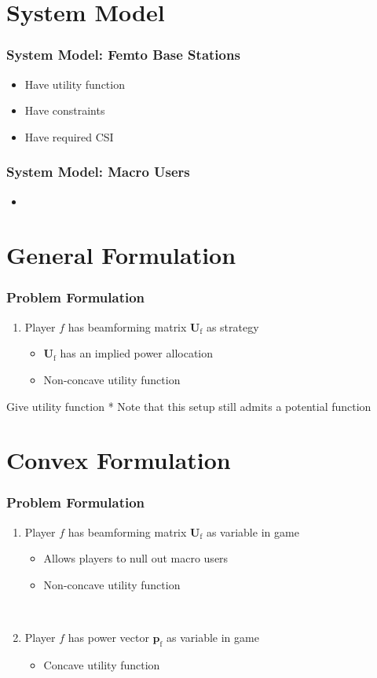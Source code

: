 \documentclass[10pt,tgadventor, onlymath]{beamer}
\begin{document}
\section{System Model}
\begin{frame}
\frametitle{System Model: Femto Base Stations}
\begin{itemize}
\item 
	Have utility function
\item 
	Have constraints
\item 
	Have required CSI
\end{itemize}
\end{frame}

\begin{frame}
\frametitle{System Model: Macro Users}
\begin{itemize}
\item
	
\end{itemize}
\end{frame}


\section{General Formulation}
\begin{frame}
\frametitle{Problem Formulation}
\begin{enumerate}
\item  Player $f$ has beamforming matrix $\mathbf{U}_\mathrm{f}$ as strategy
\begin{itemize}
\item $\mathbf{U}_\mathrm{f}$ has an implied power allocation
\item Non-concave utility function
\end{itemize}
\end{enumerate}
Give utility function 
* Note that this setup still admits a potential function
\end{frame}


\section{Convex Formulation}
\begin{frame}
\frametitle{Problem Formulation}
\begin{enumerate}
\item  Player $f$ has beamforming matrix $\mathbf{U}_\mathrm{f}$ as variable in game
\begin{itemize}
\item  Allows players to null out macro users
\item Non-concave utility function
\end{itemize}
\
\item  Player $f$ has power vector $\mathbf{p}_\mathrm{f}$ as variable in game
\begin{itemize}
\item Concave utility function
\end{itemize}
\end{enumerate}
\end{frame}
\end{document}
